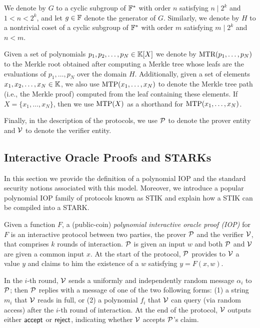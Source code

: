 We denote by $G$ to a cyclic subgroup of $\FF^*$ with order $n$ satisfying $n \mid 2^k$ and $1 < n < 2^k$, and let $g \in \FF$ denote the generator of $G$. Similarly, we denote by $H$ to a nontrivial coset of a cyclic subgroup of $\FF^*$ with order $m$ satisfying $m \mid 2^k$ and $n < m$.

Given a set of polynomials $p_1,p_2,\dots,p_N \in \KK[X]$ we denote by $\MTR(p_1,\dots,p_N)$ to the Merkle root obtained after computing a Merkle tree \cite{C:Merkle87} whose leafs are the evaluations of $p_1,\dots,p_N$ over the domain $H$. Additionally, given a set of elements $x_1,x_2,\dots,x_N \in \KK$, we also use $\MTP(x_1,\dots,x_N)$ to denote the Merkle tree path (i.e., the Merkle proof) computed from the leaf containing these elements. If $X = \{x_1,\dots,x_N\}$, then we use $\MTP(X)$ as a shorthand for $\MTP(x_1,\dots,x_N)$.

Finally, in the description of the protocols, we use $\P$ to denote the prover entity and $\V$ to denote the verifier entity.


\subsection{Interactive Oracle Proofs and STARKs}\label{sec:IOP}


In this section we provide the definition of a polynomial IOP \cite{EPRINT:BenChiSpo16} and the standard security notions associated with this model. Moreover, we introduce a popular polynomial IOP family of protocols known as STIK \cite{C:BBHR19} and explain how a STIK  can be compiled into a STARK.

\begin{definition}
  Given a function $F$, a (public-coin) \textit{polynomial interactive oracle proof (IOP)} for $F$ is an interactive protocol between two parties, the prover $\P$ and the verifier $\V$, that comprises $k$ rounds of interaction. $\P$ is given an input $w$ and both $\P$ and $\V$ are given a common input $x$. At the start of the protocol, $\P$ provides to $\V$ a value $y$ and claims to him the existence of a $w$ satisfying $y = F(x,w)$. 
  
  In the $i$-th round, $\V$ sends a uniformly and independently random message $\alpha_i$ to $\P$; then $\P$ replies with a message of one of the two following forms: (1) a string $m_i$ that $\V$ reads in full, or (2) a polynomial $f_i$ that $\V$ can query (via random access) after the $i$-th round of interaction. At the end of the protocol, $\V$ outputs either $\accept$ or $\reject$, indicating whether $\V$ accepts $\P$'s claim.
\end{definition}

